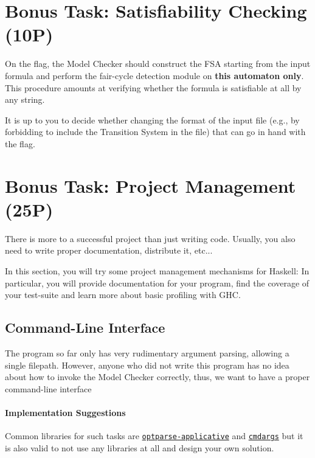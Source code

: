 \documentclass{article}
\begin{document}
\section{Bonus Task: Satisfiability Checking (10P)}
On the  flag, the Model Checker should construct the FSA starting from the input formula
and perform the fair-cycle detection module on \textbf{this automaton only}. 
This procedure amounts at verifying whether the formula is satisfiable at all by any string. 

It is up to you to decide whether changing the format of the input file 
(e.g., by forbidding to include the Transition System in the file) 
that can go in hand with the  flag.

\section{Bonus Task: Project Management (25P)}

There is more to a successful project than just writing code. 
Usually, you also need to write proper documentation, distribute it, etc...

In this section, you will try some project management mechanisms for Haskell: 
In particular, you will provide documentation for your program, 
find the coverage of your test-suite and learn more about basic profiling with GHC.

\subsection{Command-Line Interface}

The program so far only has very rudimentary argument parsing, allowing a single filepath.
However, anyone who did not write this program has no idea about how to invoke the Model Checker correctly,
thus, we want to have a proper command-line interface

\paragraph{Implementation Suggestions}

Common libraries for such tasks are \href{https://hackage.haskell.org/package/optparse-applicative}{\texttt{optparse-applicative}} 
and \href{https://hackage.haskell.org/package/cmdargs}{\texttt{cmdargs}} but it is also valid to not use any libraries at all 
and design your own solution.
\end{document}
